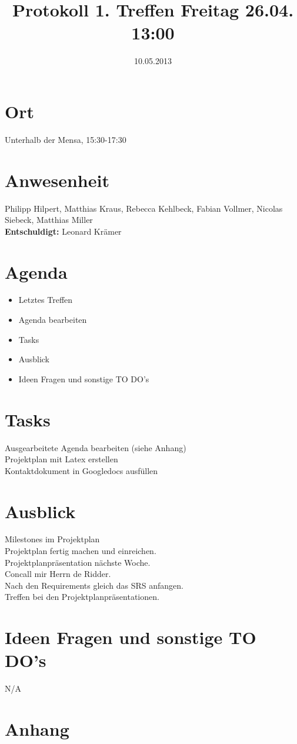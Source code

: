 \documentclass{scrartcl}
\date{10.05.2013}
\title{Protokoll 1. Treffen Freitag 26.04. 13:00}
\begin{document}
\maketitle
\section{Ort}
Unterhalb der Mensa, 15:30-17:30
\section{Anwesenheit}
Philipp Hilpert, Matthias Kraus, Rebecca Kehlbeck, Fabian Vollmer, Nicolas Siebeck, Matthias Miller \\
\textbf{Entschuldigt:} Leonard Krämer
\vspace*{-0.5cm}
\section{Agenda}
\begin{itemize}
\item Letztes Treffen
\item Agenda bearbeiten
\item Tasks
\item Ausblick
\item Ideen Fragen und sonstige TO DO's
\end{itemize}
\vspace*{-0.5cm}
\section{Tasks}
Ausgearbeitete Agenda bearbeiten (siehe Anhang) \\
Projektplan mit Latex erstellen \\
Kontaktdokument in Googledocs ausfüllen\\
\vspace*{-0.5cm}
\section{Ausblick}
Milestones im Projektplan \\
Projektplan fertig machen und einreichen. \\
Projektplanpräsentation nächste Woche. \\
Concall mir Herrn de Ridder. \\
Nach den Requirements gleich das SRS anfangen. \\
Treffen bei den Projektplanpräsentationen.
\vspace*{-0.5cm}
\section{Ideen Fragen und sonstige TO DO's}
N/A
\vspace*{-0.5cm}
\section{Anhang}
\setcounter{section}{0}
\renewcommand*{\theHsection}{chX.\the\value{section}}

\end{document}
